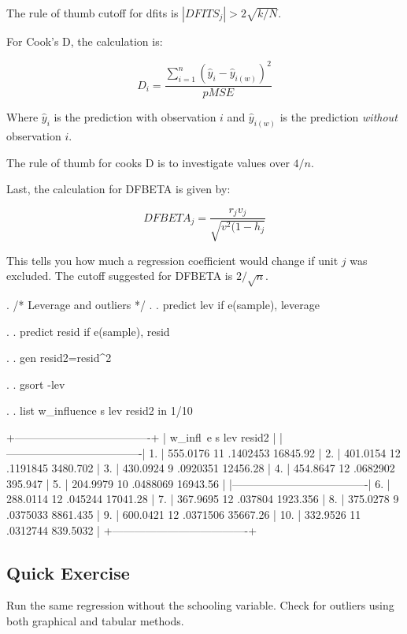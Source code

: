 \documentclass[12pt]{article}
\begin{document}
The rule of thumb cutoff for dfits is $|{DFITS_j}|>2 \sqrt{k/N}$.

For Cook's D, the calculation is:

\begin{equation*}
  D_i=\frac{\sum_{i=1}^n(\hat{y}_i-\hat{y}_{i(w)})^2}{p MSE}
\end{equation*}

Where $\hat{y}_i$ is the prediction with observation $i$ and
$\hat{y}_{i(w)}$ is the prediction \emph{without} observation $i$. 

The rule of thumb for cooks D is to investigate values over $4/n$. 

Last, the calculation for DFBETA is given by: 

\begin{equation*}
  DFBETA_j=\frac{r_jv_j}{\sqrt{v^2(1-h_j}}
\end{equation*}

This tells you how much a regression coefficient would change if unit
$j$ was excluded. The cutoff suggested for DFBETA is $2/\sqrt{n}$. 

\begin{stlog}
. /* Leverage and outliers  */
.   
. predict lev if e(sample), leverage

. 
. predict resid if e(sample), resid

. 
. gen  resid2=resid^2

. 
. gsort -lev

. 
. list w_influence s lev resid2 in 1/10

     +-------------------------------------+
     | w_infl~e    s        lev     resid2 |
     |-------------------------------------|
  1. | 555.0176   11   .1402453   16845.92 |
  2. | 401.0154   12   .1191845   3480.702 |
  3. | 430.0924    9   .0920351   12456.28 |
  4. | 454.8647   12   .0682902    395.947 |
  5. | 204.9979   10   .0488069   16943.56 |
     |-------------------------------------|
  6. | 288.0114   12    .045244   17041.28 |
  7. | 367.9695   12    .037804   1923.356 |
  8. | 375.0278    9   .0375033   8861.435 |
  9. | 600.0421   12   .0371506   35667.26 |
 10. | 332.9526   11   .0312744   839.5032 |
     +-------------------------------------+
\end{stlog}

\subsection{Quick Exercise}

Run the same regression without the schooling variable. Check for
outliers using both graphical and tabular methods. 
\end{document}
